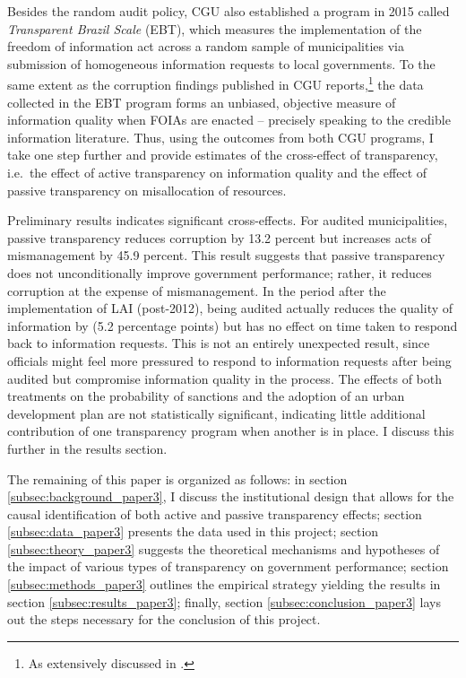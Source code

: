 \documentclass[11pt]{article}
\begin{document}
Besides the random audit policy, CGU also established a program in 2015 called \emph{Transparent Brazil Scale} (EBT), which measures the implementation of the freedom of information act across a random sample of municipalities via submission of homogeneous information requests to local governments. To the same extent as the corruption findings published in CGU reports,\footnote{As extensively discussed in \citet{FerrazExposingCorruptPoliticians2008b,FerrazElectoralAccountabilityCorruption2011a,BrolloPoliticalResourceCurse2013,ZamboniAuditRiskRent2018,AvisGovernmentAuditsReduce2018}.} the data collected in the EBT program forms an unbiased, objective measure of information quality when FOIAs are enacted -- precisely speaking to the credible information literature. Thus, using the outcomes from both CGU programs, I take one step further and provide estimates of the cross-effect of transparency, i.e.~the effect of active transparency on information quality and the effect of passive transparency on misallocation of resources.

Preliminary results indicates significant cross-effects. For audited municipalities, passive transparency reduces corruption by 13.2 percent but increases acts of mismanagement by 45.9 percent. This result suggests that passive transparency does not unconditionally improve government performance; rather, it reduces corruption at the expense of mismanagement. In the period after the implementation of LAI (post-2012), being audited actually reduces the quality of information by (5.2 percentage points) but has no effect on time taken to respond back to information requests. This is not an entirely unexpected result, since officials might feel more pressured to respond to information requests after being audited but compromise information quality in the process. The effects of both treatments on the probability of sanctions and the adoption of an urban development plan are not statistically significant, indicating little additional contribution of one transparency program when another is in place. I discuss this further in the results section.

The remaining of this paper is organized as follows: in section \ref{subsec:background_paper3}, I discuss the institutional design that allows for the causal identification of both active and passive transparency effects; section \ref{subsec:data_paper3} presents the data used in this project; section \ref{subsec:theory_paper3} suggests the theoretical mechanisms and hypotheses of the impact of various types of transparency on government performance; section \ref{subsec:methods_paper3} outlines the empirical strategy yielding the results in section \ref{subsec:results_paper3}; finally, section \ref{subsec:conclusion_paper3} lays out the steps necessary for the conclusion of this project.
\end{document}
